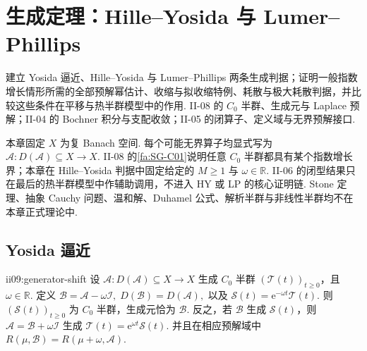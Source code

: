 \chapter{生成定理：Hille--Yosida 与 Lumer--Phillips}\label{chap:II-09}
\FAChapterOpening
{建立 Yosida 逼近、Hille--Yosida 与 Lumer--Phillips 两条生成判据；证明一般指数增长情形所需的全部预解幂估计、收缩与拟收缩特例、耗散与极大耗散判据，并比较这些条件在平移与热半群模型中的作用.}
{II-08 的 \(\displaystyle C_0\) 半群、生成元与 Laplace 预解；II-04 的 Bochner 积分与支配收敛；II-05 的闭算子、定义域与无界预解接口.}
{\begin{center}
\end{center}}

本章固定 \(\displaystyle X\) 为复 Banach 空间. 每个可能无界算子均显式写为 \(\displaystyle \mathcal A:D(\mathcal A)\subseteq X\to X.\)
II-08 的\autoref{fa:SG-C01}说明任意 \(\displaystyle C_0\) 半群都具有某个指数增长界；本章在 Hille--Yosida 判据中固定给定的 \(\displaystyle M\geqslant1\) 与 \(\displaystyle\omega\in\mathbb R\). II-06 的闭型结果只在最后的热半群模型中作辅助调用，不进入 HY 或 LP 的核心证明链. Stone 定理、抽象 Cauchy 问题、温和解、Duhamel 公式、解析半群与非线性半群均不在本章正式理论中.

\section{Yosida 逼近}\label{sec:ii09-yosida}

\begin{FAProposition}[B][生成元平移与预解平移]{ii09:generator-shift}
设 \(\displaystyle \mathcal A:D(\mathcal A)\subseteq X\to X\)
生成 \(\displaystyle C_0\) 半群 \(\displaystyle(\mathcal T(t))_{t\geqslant0}\)，且 \(\displaystyle\omega\in\mathbb R\). 定义 \(\displaystyle \mathcal B=\mathcal A-\omega\mathcal I, \; D(\mathcal B)=D(\mathcal A),\)
以及 \(\displaystyle \mathcal S(t)=\mathrm{e}^{-\omega t}\mathcal T(t).\)
则 \(\displaystyle(\mathcal S(t))_{t\geqslant0}\) 为 \(\displaystyle C_0\) 半群，生成元恰为 \(\displaystyle\mathcal B\). 反之，若 \(\displaystyle\mathcal B\) 生成 \(\displaystyle\mathcal S(t)\)，则 \(\displaystyle\mathcal A=\mathcal B+\omega\mathcal I\) 生成 \(\displaystyle\mathcal T(t)=\mathrm{e}^{\omega t}\mathcal S(t)\). 并且在相应预解域中 \(\displaystyle R(\mu,\mathcal B)=R(\mu+\omega,\mathcal A).\)
\end{FAProposition}

